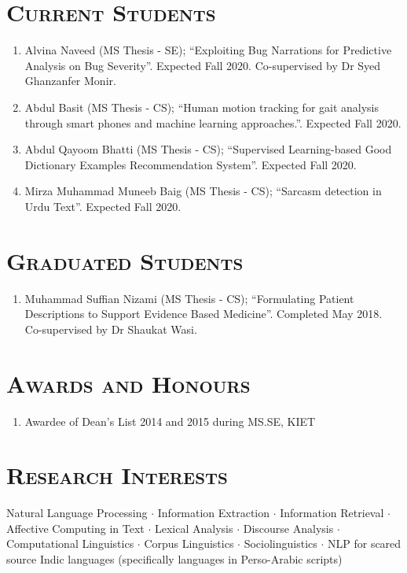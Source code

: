 \documentclass[a4paper, 10pt]{article}
\begin{document}
\section*{\normalfont\textsc{Current Students}}
\begin{enumerate}
\itemsep-4pt 
 \item Alvina Naveed (MS Thesis - SE); ``Exploiting Bug Narrations for Predictive Analysis on Bug Severity''. Expected Fall 2020. Co-supervised by Dr Syed Ghanzanfer Monir.
 
 \item Abdul Basit (MS Thesis - CS); ``Human motion tracking for gait analysis through smart phones and machine learning approaches.''. Expected Fall 2020.
 
  \item Abdul Qayoom Bhatti (MS Thesis - CS); ``Supervised Learning-based Good Dictionary Examples Recommendation System''. Expected Fall 2020. 
  
    \item Mirza Muhammad Muneeb Baig (MS Thesis - CS); ``Sarcasm detection in Urdu Text''. Expected Fall 2020.
 
\end{enumerate}



\section*{\normalfont\textsc{Graduated Students}}
\begin{enumerate}
\itemsep-4pt 
 \item Muhammad Suffian Nizami (MS Thesis - CS); ``Formulating Patient Descriptions to Support Evidence Based Medicine''. Completed May 2018. Co-supervised by Dr Shaukat Wasi.
\end{enumerate}


\section*{\normalfont\textsc{Awards and Honours}}
\begin{enumerate}
\itemsep-4pt 
 \item Awardee of Dean's List 2014 and 2015 during MS.SE, KIET
\end{enumerate}

\section*{\normalfont\textsc{Research Interests}}
Natural Language Processing $\cdot$ Information Extraction $\cdot$ Information Retrieval $\cdot$ Affective Computing in Text $\cdot$ Lexical Analysis $\cdot$ Discourse Analysis $\cdot$ Computational Linguistics $\cdot$  Corpus Linguistics $\cdot$ Sociolinguistics $\cdot$ NLP for scared source Indic languages (specifically languages in Perso-Arabic scripts)
\end{document}
